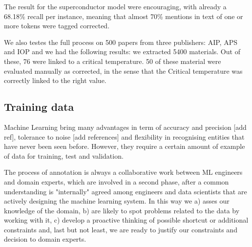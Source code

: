 \documentclass{article}
\begin{document}
The result for the superconductor model were encouraging, with already a 68.18\% recall per instance, meaning that almost 70\% mentions in text of one or more tokens were tagged corrected. 

We also testes the full process on 500 papers from three publishers: AIP, APS and IOP and we had the following results: we extracted 5400 materials. 
Out of these, 76 were linked to a critical temperature. 50 of these material were evaluated manually as corrected, in the sense that the Critical temperature was correctly linked to the right value. 

\subsection{Training data}
\label{sec:training-data}

Machine Learning bring many advantages in term of accuracy and precision [add ref], tolerance to noise [add references] and flexibility in recognising entities that have never been seen before. However, they require a certain amount of example of data for training, test and validation. 


The process of annotation is always a collaborative work between ML engineers and domain experts, which are involved in a second phase, after a common understanding is "internally" agreed among engineers and data scientists that are actively designing the machine learning system. 
In this way we a) asses our knowledge of the domain, b) are likely to spot problems related to the data by working with it, c) develop a proactive thinking of possible shortcut or additional constraints and, last but not least, we are ready to justify our constraints and decision to domain experts. 
\end{document}

